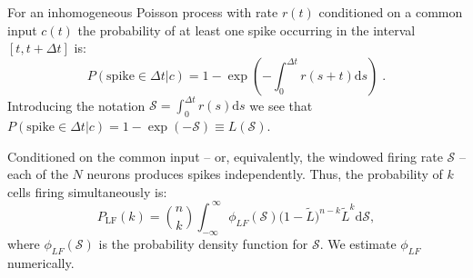 \documentclass[%
 reprint,
 twocolumn,
 amsmath,amssymb,
 aps,
floatfix,
]{revtex4}
\newcommand{\dd}{\mathrm{d}}
\begin{document}
For an inhomogeneous Poisson process with rate $r(t)$ conditioned on a common input $c(t)$ the probability of at least one spike occurring in the interval $[t,t+\Delta t]$ is:
\begin{equation*}
P(\text{spike}\in\Delta t | c ) = 1 - \exp{\left(-\int_0^{\Delta t} \! r(s+t) \dd s \right)} \;.
\end{equation*}
Introducing the notation  $\mathcal{S} = \int_0^{\Delta t} \! r(s) \dd s $ we see that $P(\text{spike}\in\Delta t | c ) = 1 - \exp (-\mathcal{S}) \equiv L(\mathcal{S})$.  

Conditioned on the common input -- or, equivalently, the windowed firing rate $\mathcal{S}$ -- each of the $N$ neurons produces spikes independently. Thus, the probability of $k$ cells firing simultaneously is:
\begin{equation}
P_{\text{LF}}(k) = \binom{n}{k} \int_{-\infty}^{~\infty} \phi_{LF}(\mathcal{S}) \big(1-\tilde{L}\big)^{n-k} \tilde{L}^{k} \dd \mathcal{S},
\end{equation}
where $\phi_{LF}(\mathcal{S})$ is the probability density function for $\mathcal{S}$.  We estimate $\phi_{LF}$ numerically.
\end{document}
